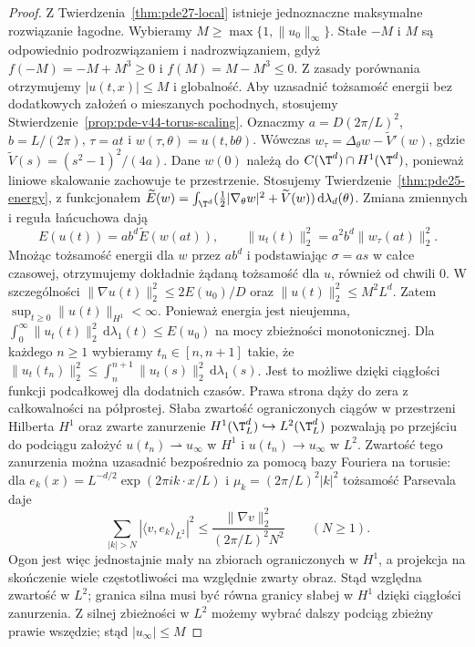 \begin{proof}
Z Twierdzenia~\ref{thm:pde27-local} istnieje
jednoznaczne maksymalne rozwiązanie łagodne.
Wybieramy $M\ge\max\{1,\|u_0\|_\infty\}$.
Stałe $-M$ i $M$ są odpowiednio podrozwiązaniem
i nadrozwiązaniem, gdyż $f(-M)=-M+M^3\ge0$
i $f(M)=M-M^3\le0$. Z zasady porównania
otrzymujemy $|u(t,x)|\le M$ i globalność.
Aby uzasadnić tożsamość energii bez dodatkowych
założeń o mieszanych pochodnych, stosujemy
Stwierdzenie~\ref{prop:pde-v44-torus-scaling}.
Oznaczmy $a=D(2\pi/L)^2$, $b=L/(2\pi)$,
$\tau=at$ i $w(\tau,\theta)=u(t,b\theta)$.
Wówczas $w_\tau=\Delta_\theta w-\widetilde V'(w)$,
gdzie $\widetilde V(s)=(s^2-1)^2/(4a)$.
Dane $w(0)$ należą do $C(\T^d)\cap H^1(\T^d)$,
ponieważ liniowe skalowanie zachowuje te przestrzenie.
Stosujemy Twierdzenie~\ref{thm:pde25-energy},
z funkcjonałem
$\widetilde E(w)=\int_{\T^d}
(\frac12|\nabla_\theta w|^2+\widetilde V(w))
\,\mathrm d\lambda_d(\theta)$.
Zmiana zmiennych i reguła łańcuchowa dają
\[
 E(u(t))=ab^d\widetilde E(w(at)),\qquad
 \|u_t(t)\|_2^2=a^2b^d\|w_\tau(at)\|_2^2.
\]
Mnożąc tożsamość energii dla $w$ przez $ab^d$
i podstawiając $\sigma=as$ w całce czasowej,
otrzymujemy dokładnie żądaną tożsamość dla $u$,
również od chwili $0$.
W szczególności
$\|\nabla u(t)\|_2^2\le2E(u_0)/D$ oraz
$\|u(t)\|_2^2\le M^2L^d$. Zatem
$\sup_{t\ge0}\|u(t)\|_{H^1}<\infty$.
Ponieważ energia jest nieujemna,
$\int_0^\infty\|u_t(t)\|_2^2\,\mathrm d\lambda_1(t)
\le E(u_0)$ na mocy zbieżności monotonicznej.
Dla każdego $n\ge1$ wybieramy $t_n\in[n,n+1]$
takie, że
$\|u_t(t_n)\|_2^2\le\int_n^{n+1}\|u_t(s)\|_2^2
\,\mathrm d\lambda_1(s)$.
Jest to możliwe dzięki ciągłości funkcji podcałkowej
dla dodatnich czasów. Prawa strona dąży do zera
z całkowalności na półprostej.
Słaba zwartość ograniczonych ciągów w przestrzeni
Hilberta $H^1$ oraz zwarte zanurzenie
$H^1(\T_L^d)\hookrightarrow L^2(\T_L^d)$
pozwalają po przejściu do podciągu założyć
$u(t_n)\rightharpoonup u_\infty$ w $H^1$ i
$u(t_n)\to u_\infty$ w $L^2$.
Zwartość tego zanurzenia można uzasadnić bezpośrednio
za pomocą bazy Fouriera na torusie: dla
$e_k(x)=L^{-d/2}\exp(2\pi i k\cdot x/L)$
i $\mu_k=(2\pi/L)^2|k|^2$ tożsamość Parsevala daje
\[
 \sum_{|k|>N}|\langle v,e_k\rangle_{L^2}|^2
 \le \frac{\|\nabla v\|_2^2}{(2\pi/L)^2N^2}
 \qquad(N\ge1).
\]
Ogon jest więc jednostajnie mały na zbiorach
ograniczonych w $H^1$, a projekcja na skończenie
wiele częstotliwości ma względnie zwarty obraz.
Stąd względna zwartość w $L^2$; granica silna
musi być równa granicy słabej w $H^1$ dzięki
ciągłości zanurzenia. Z silnej zbieżności w $L^2$
możemy wybrać dalszy
podciąg zbieżny prawie wszędzie; stąd $|u_\infty|\le M$

\end{proof}
